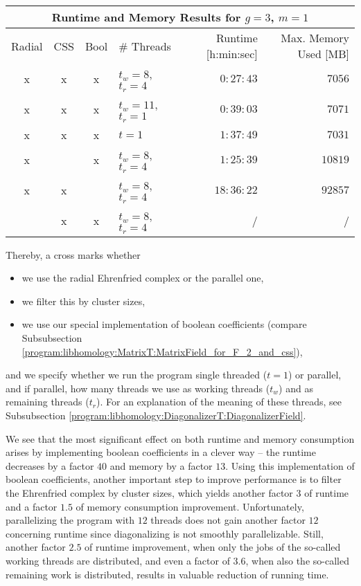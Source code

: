 \begin{center}
  \begin{tabular}{|c|c|c|l||r|r|}
      \cline{1-6}
      \multicolumn{6}{|c|}{Runtime and Memory Results for $g = 3$, $m = 1$} \\ \hline \hline
      Radial & CSS & Bool & \# Threads            & Runtime [h:min:sec] & Max. Memory Used [MB] \\ \hline\hline
      x      & x   & x    & $t_w = 8$, $t_r = 4$  & $0:27:43$           & $7056$  \\ \hline
      x      & x   & x    & $t_w = 11$, $t_r = 1$ & $0:39:03$           & $7071$  \\ \hline
      x      & x   & x    & $t = 1$               & $1:37:49$           & $7031$  \\ \hline
      x      &     & x    & $t_w = 8$, $t_r = 4$  & $1:25:39$           & $10819$ \\ \hline
      x      & x   &      & $t_w = 8$, $t_r = 4$  & $18:36:22$          & $92857$ \\ \hline
             & x   & x    & $t_w = 8$, $t_r = 4$  & /                   & /       \\ \hline
  \end{tabular}
\end{center}

Thereby, a cross marks whether 
\begin{itemize}
\item we use the radial Ehrenfried complex or the parallel one, 
\item we filter this by cluster sizes,
\item we use our special implementation of boolean coefficients (compare Subsubsection \ref{program:libhomology:MatrixT:MatrixField_for_F_2_and_css}),
\end{itemize}
and we specify whether we run the program single threaded ($t = 1$) or parallel, and if parallel, 
how many threads we use as working threads ($t_w$) and as remaining threads ($t_r$).
For an explanation of the meaning of these threads, see Subsubsection \ref{program:libhomology:DiagonalizerT:DiagonalizerField}.

We see that the most significant effect on both runtime and memory consumption arises by implementing boolean coefficients in a clever way
-- the runtime decreases by a factor $40$ and memory by a factor $13$.
Using this implementation of boolean coefficients, another important step to improve performance is to filter the Ehrenfried complex by cluster sizes,
which yields another factor $3$ of runtime and a factor $1.5$ of memory consumption improvement.
Unfortunately, parallelizing the program with $12$ threads does not gain another factor $12$ concerning runtime 
since diagonalizing is not smoothly parallelizable.
Still, another factor $2.5$ of runtime improvement, when only the jobs of the so-called working threads are distributed,
and even a factor of $3.6$, when also the so-called remaining work is distributed, results in valuable reduction of running time.